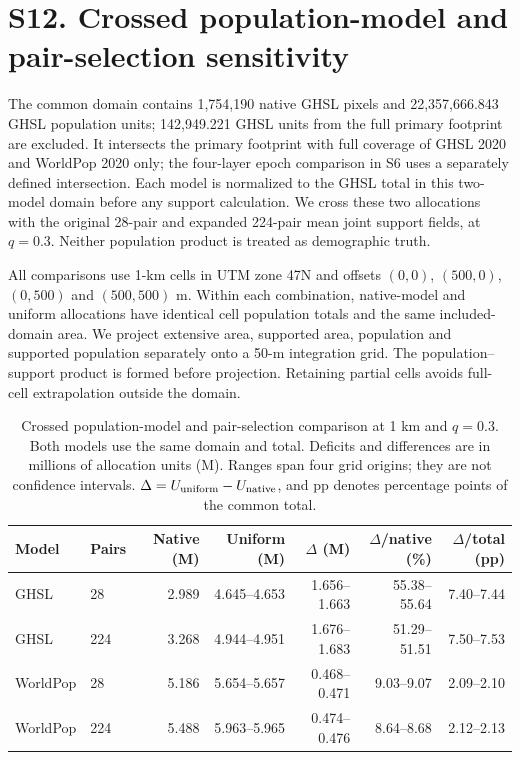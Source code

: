 \section*{S12. Crossed population-model and pair-selection sensitivity}
The common domain contains 1,754,190 native GHSL pixels and 22,357,666.843 GHSL population units; 142,949.221 GHSL units from the full primary footprint are excluded. It intersects the primary footprint with full coverage of GHSL 2020 and WorldPop 2020 only; the four-layer epoch comparison in S6 uses a separately defined intersection. Each model is normalized to the GHSL total in this two-model domain before any support calculation. We cross these two allocations with the original 28-pair and expanded 224-pair mean joint support fields, at $q=0.3$. Neither population product is treated as demographic truth.

All comparisons use 1-km cells in UTM zone 47N and offsets $(0,0)$, $(500,0)$, $(0,500)$ and $(500,500)$ m. Within each combination, native-model and uniform allocations have identical cell population totals and the same included-domain area. We project extensive area, supported area, population and supported population separately onto a 50-m integration grid. The population--support product is formed before projection. Retaining partial cells avoids full-cell extrapolation outside the domain.

\begin{table}[htbp]\centering\footnotesize
\caption{Crossed population-model and pair-selection comparison at 1 km and $q=0.3$. Both models use the same domain and total. Deficits and differences are in millions of allocation units (M). Ranges span four grid origins; they are not confidence intervals. $\Delta=U_{\rm uniform}-U_{\rm native}$, and pp denotes percentage points of the common total.}\label{tab:cross}
\setlength{\tabcolsep}{3.5pt}
\begin{tabular}{llrrrrr}\toprule
Model & Pairs & Native (M) & Uniform (M) & $\Delta$ (M) & $\Delta$/native (\%) & $\Delta$/total (pp)\\\midrule
GHSL & 28 & 2.989 & 4.645--4.653 & 1.656--1.663 & 55.38--55.64 & 7.40--7.44\\
GHSL & 224 & 3.268 & 4.944--4.951 & 1.676--1.683 & 51.29--51.51 & 7.50--7.53\\
WorldPop & 28 & 5.186 & 5.654--5.657 & 0.468--0.471 & 9.03--9.07 & 2.09--2.10\\
WorldPop & 224 & 5.488 & 5.963--5.965 & 0.474--0.476 & 8.64--8.68 & 2.12--2.13\\
\bottomrule\end{tabular}\end{table}


